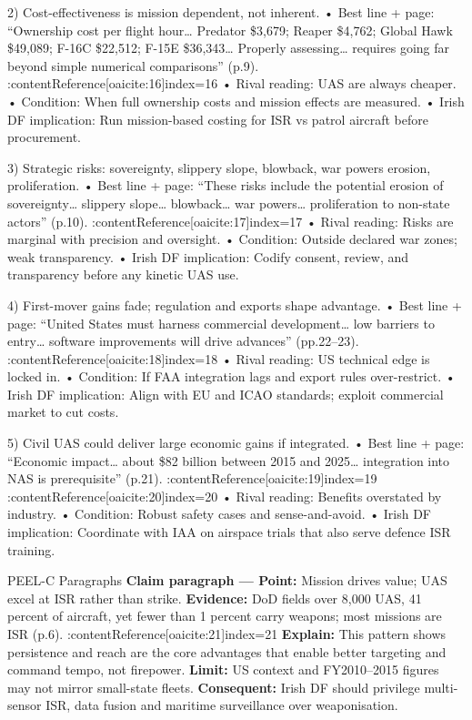 2) Cost-effectiveness is mission dependent, not inherent.  
• Best line + page: “Ownership cost per flight hour… Predator \$3,679; Reaper \$4,762; Global Hawk \$49,089; F-16C \$22,512; F-15E \$36,343… Properly assessing… requires going far beyond simple numerical comparisons” (p.9). :contentReference[oaicite:16]{index=16}  
• Rival reading: UAS are always cheaper.  
• Condition: When full ownership costs and mission effects are measured.  
• Irish DF implication: Run mission-based costing for ISR vs patrol aircraft before procurement.

3) Strategic risks: sovereignty, slippery slope, blowback, war powers erosion, proliferation.  
• Best line + page: “These risks include the potential erosion of sovereignty… slippery slope… blowback… war powers… proliferation to non-state actors” (p.10). :contentReference[oaicite:17]{index=17}  
• Rival reading: Risks are marginal with precision and oversight.  
• Condition: Outside declared war zones; weak transparency.  
• Irish DF implication: Codify consent, review, and transparency before any kinetic UAS use.

4) First-mover gains fade; regulation and exports shape advantage.  
• Best line + page: “United States must harness commercial development… low barriers to entry… software improvements will drive advances” (pp.22–23). :contentReference[oaicite:18]{index=18}  
• Rival reading: US technical edge is locked in.  
• Condition: If FAA integration lags and export rules over-restrict.  
• Irish DF implication: Align with EU and ICAO standards; exploit commercial market to cut costs.

5) Civil UAS could deliver large economic gains if integrated.  
• Best line + page: “Economic impact… about \$82 billion between 2015 and 2025… integration into NAS is prerequisite” (p.21). :contentReference[oaicite:19]{index=19} :contentReference[oaicite:20]{index=20}  
• Rival reading: Benefits overstated by industry.  
• Condition: Robust safety cases and sense-and-avoid.  
• Irish DF implication: Coordinate with IAA on airspace trials that also serve defence ISR training.


    PEEL-C Paragraphs
\textbf{Claim paragraph — Point:} Mission drives value; UAS excel at ISR rather than strike.  
\textbf{Evidence:} DoD fields over 8,000 UAS, 41 percent of aircraft, yet fewer than 1 percent carry weapons; most missions are ISR (p.6). :contentReference[oaicite:21]{index=21}  
\textbf{Explain:} This pattern shows persistence and reach are the core advantages that enable better targeting and command tempo, not firepower.  
\textbf{Limit:} US context and FY2010–2015 figures may not mirror small-state fleets.  
\textbf{Consequent:} Irish DF should privilege multi-sensor ISR, data fusion and maritime surveillance over weaponisation.

